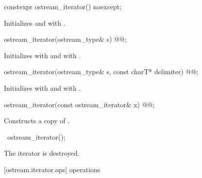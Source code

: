 \begin{addedblock}
%
\begin{itemdecl}
constexpr ostream_iterator() noexcept;
\end{itemdecl}

\begin{itemdescr}
\pnum
\effects
Initializes  and  with .
\end{itemdescr}
\end{addedblock}

%
\begin{itemdecl}
ostream_iterator(ostream_type& s) @@;
\end{itemdecl}

\begin{itemdescr}
\pnum
\effects
Initializes  with  and  with .
\end{itemdescr}

%
\begin{itemdecl}
ostream_iterator(ostream_type& s, const charT* delimiter) @@;
\end{itemdecl}

\begin{itemdescr}
\pnum
\effects
Initializes  with  and  with .
\end{itemdescr}

%
\begin{itemdecl}
ostream_iterator(const ostream_iterator& x) @@;
\end{itemdecl}

\begin{itemdescr}
\pnum
\effects
Constructs a copy of .
\end{itemdescr}

%
\begin{itemdecl}
~ostream_iterator();
\end{itemdecl}

\begin{itemdescr}
\pnum
\effects
The iterator is destroyed.
\end{itemdescr}

[ostream.iterator.ops]{ operations}

